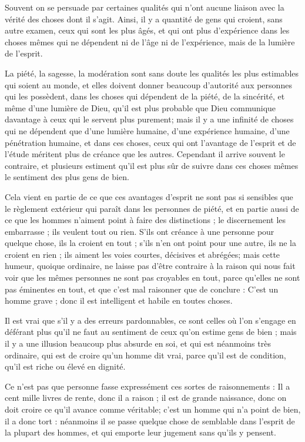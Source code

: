 Souvent on se persuade par certaines qualités qui n'ont aucune liaison avec la vérité des choses dont il s'agit. Ainsi, il y a quantité de gens qui croient, sans autre examen, ceux qui sont les plus âgés, et qui ont plus d'expérience dans les choses mêmes qui ne dépendent ni de l'âge ni de l'expérience, mais de la lumière de l'esprit.

La piété, la sagesse, la modération sont sans doute les qualités les plus estimables qui soient au monde, et elles doivent donner beaucoup d'autorité aux personnes qui les possèdent, dans les choses qui dépendent de la piété, de la sincérité, et même d'une lumière de Dieu, qu'il est plus probable que Dieu communique davantage à ceux qui le servent plus purement; mais il y a une infinité de choses qui ne dépendent que d'une lumière humaine, d'une expérience humaine, d'une pénétration humaine, et dans ces choses, ceux qui ont l'avantage de l'esprit et de l'étude méritent plus de créance que les autres. Cependant il arrive souvent le contraire, et plusieurs estiment qu'il est plus sûr de suivre dans ces choses mêmes le sentiment des plus gens de bien.

Cela vient en partie de ce que ces avantages d'esprit ne sont pas si sensibles que le règlement extérieur qui paraît dans les personnes de piété, et en partie aussi de ce que les hommes n'aiment point à faire des distinctions ; le discernement les embarrasse ; ils veulent tout ou rien. S'ils ont créance à une personne pour quelque chose, ils la croient en tout ; s'ils n'en ont point pour une autre, ils ne la croient en rien ; ils aiment les voies courtes, décisives et abrégées; mais cette humeur, quoique ordinaire, ne laisse pas d'être contraire à la raison qui nous fait voir que les mêmes personnes ne sont pas croyables en tout, parce qu'elles ne sont pas éminentes en tout, et que c'est mal raisonner que de conclure : C'est un homme grave ; donc il est intelligent et habile en toutes choses.

Il est vrai que s'il y a des erreurs pardonnables, ce sont celles où l'on s'engage en déférant plus qu'il ne faut au sentiment de ceux qu'on estime gens de bien ; mais il y a une illusion beaucoup plus absurde en soi, et qui est néanmoins très ordinaire, qui est de croire qu'un homme dit vrai, parce qu'il est de condition, qu'il est riche ou élevé en dignité.

Ce n'est pas que personne fasse expressément ces sortes de raisonnements : Il a cent mille livres de rente, donc il a raison ; il est de grande naissance, donc on doit croire ce qu'il avance comme véritable; c'est un homme qui n'a point de bien, il a donc tort : néanmoins il se passe quelque chose de semblable dans l'esprit de la plupart des hommes, et qui emporte leur jugement sans qu'ils y pensent.


